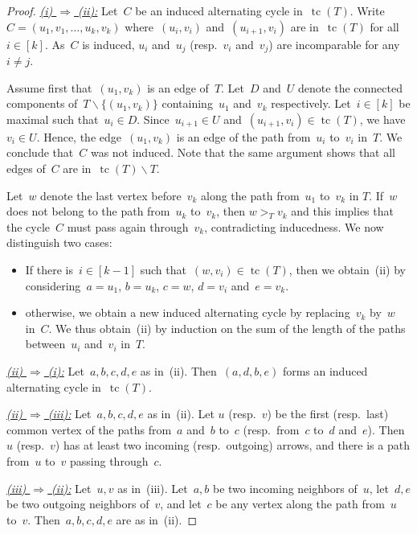 \documentclass{amsart}
\theoremstyle{definition}
\newcommand{\ssm}{\smallsetminus} %
\DeclareMathOperator{\tc}{tc} %
\newcommand{\felix}[1]{{\color{orange}#1}}
\begin{document}
\begin{proof}
\uline{\textsl{(i) $\Rightarrow$ (ii):}}
Let~$C$ be an induced alternating cycle in~$\tc(T)$.
Write~$C = (u_1, v_1, \dots, u_k, v_k)$ where~$(u_i, v_i)$ and~$(u_{i+1}, v_i)$ are in~$\tc(T)$ for all~$i \in [k]$.
As~$C$ is induced, $u_i$ and~$u_j$ (resp.~$v_i$ and~$v_j$) are incomparable for any~$i \ne j$.

Assume first that~$(u_1, v_k)$ is an edge of~$T$.
Let~$D$ and~$U$ denote the connected components of~$T \ssm \{(u_1, v_k)\}$ containing~$u_1$ and~$v_k$ respectively.
Let~$i \in [k]$ be maximal such that~$u_i \in D$.
Since~$u_{i+1} \in U$ and~$(u_{i+1}, v_i) \in \tc(T)$, we have~$v_i \in U$.
Hence, the edge~$(u_1, v_k)$ is an edge of the path from~$u_i$ to~$v_i$ in~$T$.
We conclude that~$C$ was not induced.
Note that the same argument shows that all edges of~$C$ are in~$\tc(T) \ssm T$.

Let~$w$ denote the last vertex before~$v_k$ along the path from~$u_1$ to~$v_k$ \felix{ in $T$}.
If~$w$ does not belong to the path from~$u_k$ to~$v_k$, then \felix{$w>_T v_k$ and this implies that} the cycle~$C$ must pass again through~$v_k$, contradicting inducedness.
We now distinguish two cases:
\begin{itemize}
\item If there is~$i \in [k-1]$ such that~$(w,v_i) \in \tc(T)$, then we obtain~(ii) by considering~$a = u_1$, $b = u_k$, $c = w$, $d = v_i$ and~$e = v_k$.
\item otherwise, we obtain a new induced alternating cycle by replacing~$v_k$ by~$w$ in~$C$. We thus obtain~(ii) by induction on the sum of the length of the paths between~$u_i$ and~$v_i$ in~$T$.
\qedhere
\end{itemize}

\medskip\noindent
\uline{\textsl{(ii) $\Rightarrow$ (i):}} Let~$a,b,c,d,e$ as in~(ii). Then~$(a,d,b,e)$ forms an induced alternating cycle in~$\tc(T)$.

\medskip\noindent
\uline{\textsl{(ii) $\Rightarrow$ (iii):}} Let~$a,b,c,d,e$ as in~(ii). Let $u$ (resp.~$v$) be the first (resp.~last) common vertex of the paths from~$a$ and~$b$ to~$c$ (resp.~from~$c$ to~$d$ and~$e$). Then~$u$ (resp.~$v$) has at least two incoming (resp.~outgoing) arrows, and there is a path from~$u$ to~$v$ passing through~$c$.

\medskip\noindent
\uline{\textsl{(iii) $\Rightarrow$ (ii):}} Let~$u,v$ as in~(iii). Let~$a,b$ be two incoming neighbors of~$u$, let~$d,e$ be two outgoing neighbors of~$v$, and let~$c$ be any vertex along the path from~$u$ to~$v$. Then~$a,b,c,d,e$ are as in~(ii).
\end{proof}
\end{document}
